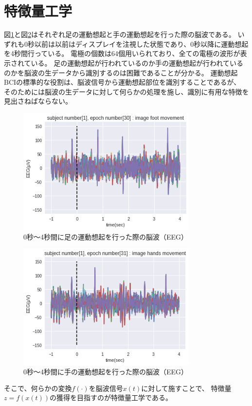 
\section{\mc 特徴量工学}
図\ref{fig:EEGfootmove}と図\ref{fig:EEGhandmove}はそれぞれ足の運動想起と手の運動想起を行った際の脳波である。
いずれも0秒以前は以前はディスプレイを注視した状態であり、0秒以降に運動想起を4秒間行っている。
電極の個数は64個用いられており、全ての電極の波形が表示されている。
足の運動想起が行われているのか手の運動想起が行われているのかを脳波の生データから識別するのは困難であることが分かる。
運動想起BCIの標準的な役割は、脳波信号から運動想起部位を識別することであるが、
そのためには脳波の生データに対して何らかの処理を施し、識別に有用な特徴を見出さねばならない。

\begin{figure}[t]
    \centering
    \includegraphics[width=9cm]{images/EEGfootmove.png}
    \caption{0秒〜4秒間に足の運動想起を行った際の脳波（EEG）}
    \label{fig:EEGfootmove}
\end{figure}
\begin{figure}[t]
    \centering
    \includegraphics[width=9cm]{images/EEGhandmove.png}
    \caption{0秒〜4秒間に手の運動想起を行った際の脳波（EEG）}
    \label{fig:EEGhandmove}
\end{figure}
そこで、何らかの変換\(f(\cdot)\)を脳波信号\(x(t)\)に対して施すことで、
特徴量\(z=f(x(t))\)の獲得を目指すのが特徴量工学である。

